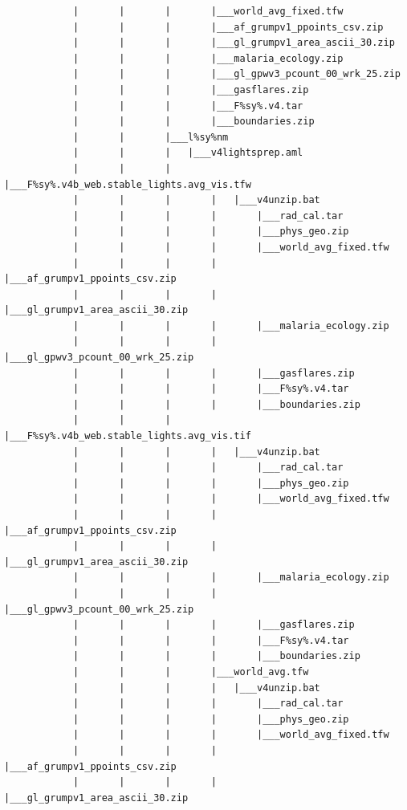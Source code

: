 \documentclass[]{book}
\begin{document}
\begin{verbatim}
            |       |       |       |___world_avg_fixed.tfw
            |       |       |       |___af_grumpv1_ppoints_csv.zip
            |       |       |       |___gl_grumpv1_area_ascii_30.zip
            |       |       |       |___malaria_ecology.zip
            |       |       |       |___gl_gpwv3_pcount_00_wrk_25.zip
            |       |       |       |___gasflares.zip
            |       |       |       |___F%sy%.v4.tar
            |       |       |       |___boundaries.zip
            |       |       |___l%sy%nm
            |       |       |   |___v4lightsprep.aml
            |       |       |       |___F%sy%.v4b_web.stable_lights.avg_vis.tfw
            |       |       |       |   |___v4unzip.bat
            |       |       |       |       |___rad_cal.tar
            |       |       |       |       |___phys_geo.zip
            |       |       |       |       |___world_avg_fixed.tfw
            |       |       |       |       |___af_grumpv1_ppoints_csv.zip
            |       |       |       |       |___gl_grumpv1_area_ascii_30.zip
            |       |       |       |       |___malaria_ecology.zip
            |       |       |       |       |___gl_gpwv3_pcount_00_wrk_25.zip
            |       |       |       |       |___gasflares.zip
            |       |       |       |       |___F%sy%.v4.tar
            |       |       |       |       |___boundaries.zip
            |       |       |       |___F%sy%.v4b_web.stable_lights.avg_vis.tif
            |       |       |       |   |___v4unzip.bat
            |       |       |       |       |___rad_cal.tar
            |       |       |       |       |___phys_geo.zip
            |       |       |       |       |___world_avg_fixed.tfw
            |       |       |       |       |___af_grumpv1_ppoints_csv.zip
            |       |       |       |       |___gl_grumpv1_area_ascii_30.zip
            |       |       |       |       |___malaria_ecology.zip
            |       |       |       |       |___gl_gpwv3_pcount_00_wrk_25.zip
            |       |       |       |       |___gasflares.zip
            |       |       |       |       |___F%sy%.v4.tar
            |       |       |       |       |___boundaries.zip
            |       |       |       |___world_avg.tfw
            |       |       |       |   |___v4unzip.bat
            |       |       |       |       |___rad_cal.tar
            |       |       |       |       |___phys_geo.zip
            |       |       |       |       |___world_avg_fixed.tfw
            |       |       |       |       |___af_grumpv1_ppoints_csv.zip
            |       |       |       |       |___gl_grumpv1_area_ascii_30.zip

\end{verbatim}
\end{document}
